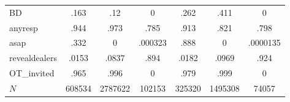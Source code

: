 \begin{tabular}{l*{6}{c}}
BD                            &         .163&          .12&            0&         .262&         .411&            0\\
anyresp                       &         .944&         .973&         .785&         .913&         .821&         .798\\
asap                          &         .332&            0&      .000323&         .888&            0&     .0000135\\
revealdealers                 &        .0153&        .0837&         .894&        .0182&        .0969&         .924\\
OT\_invited                    &         .965&         .996&            0&         .979&         .999&            0\\
\(N\)                         &       608534&      2787622&       102153&       325320&      1495308&        74057\\
\end{tabular}
